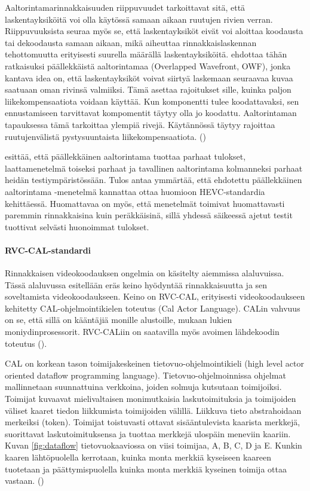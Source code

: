 Aaltorintamarinnakkaisuuden riippuvuudet tarkoittavat sitä, että
laskentayksiköitä voi olla käytössä samaan aikaan ruutujen rivien verran.
Riippuvuuksista seuraa myös se, että laskentayksiköt eivät voi aloittaa
koodausta tai dekoodausta samaan aikaan, mikä aiheuttaa rinnakkaislaskennan
tehottomuutta erityisesti suurella määrällä laskentayksiköitä.
\citealt{chi} ehdottaa tähän ratkaisuksi päällekkäistä
aaltorintamaa (Overlapped Wavefront, OWF), jonka kantava idea on, että
laskentayksiköt voivat siirtyä laskemaan seuraavaa kuvaa saatuaan oman rivinsä
valmiiksi. Tämä asettaa rajoitukset sille, kuinka paljon liikekompensaatiota
voidaan käyttää. Kun komponentti tulee koodattavaksi, sen ennustamiseen
tarvittavat kompomentit täytyy olla jo koodattu. Aaltorintaman tapauksessa
tämä tarkoittaa ylempiä rivejä. Käytännössä täytyy rajoittaa ruutujenvälistä
pystysuuntaista liikekompensaatiota. (\citealt{chi})

\citealt{chi} esittää, että päällekkäinen aaltorintama tuottaa parhaat tulokset,
laattamenetelmä toiseksi parhaat ja tavallinen aaltorintama kolmanneksi parhaat
heidän testiympäristössään. Tulos antaa ymmärtää, että ehdotettu päällekkäinen
aaltorintama -menetelmä kannattaa ottaa huomioon HEVC-standardia kehittäessä.
Huomattavaa on myös, että menetelmät toimivat huomattavasti paremmin
rinnakkaisina kuin peräkkäisinä, sillä yhdessä säikeessä ajetut testit
tuottivat selvästi huonoimmat tulokset.

\paragraph{RVC-CAL-standardi}
Rinnakkaisen videokoodauksen ongelmia on käsitelty aiemmissa alaluvuissa. Tässä
alaluvussa esitellään eräs keino hyödyntää rinnakkaisuutta ja sen soveltamista
videokoodaukseen. Keino on RVC-CAL, erityisesti videokoodaukseen kehitetty
CAL-ohjelmointikielen toteutus (Cal Actor Language). CALin vahvuus on se, että
sillä on kääntäjiä monille alustoille, mukaan lukien moniydinprosessorit.
RVC-CALiin on saatavilla myös avoimen lähdekoodin toteutus (\citealt{orcc}).

CAL on korkean tason toimijakeskeinen tietovuo-ohjelmointikieli (high level
actor oriented dataflow programming language). Tietovuo-ohjelmoinnissa ohjelmat
mallinnetaan suunnattuina verkkoina, joiden solmuja kutsutaan toimijoiksi.
Toimijat kuvaavat mielivaltaisen monimutkaisia laskutoimituksia ja toimijoiden
väliset kaaret tiedon liikkumista toimijoiden välillä. Liikkuva tieto
abstrahoidaan merkeiksi (token). Toimijat toistuvasti ottavat sisääntulevista kaarista
merkkejä, suorittavat laskutoimituksensa ja tuottaa merkkejä ulospäin
meneviin kaariin. Kuvan \ref{fig:dataflow} tietovuokaaviossa on viisi toimijaa,
A, B, C, D ja E. Kunkin kaaren lähtöpuolella kerrotaan, kuinka monta merkkiä
kyseiseen kaareen tuotetaan ja päättymispuolella kuinka monta merkkiä kyseinen
toimija ottaa vastaan. (\citealt{rvc})

